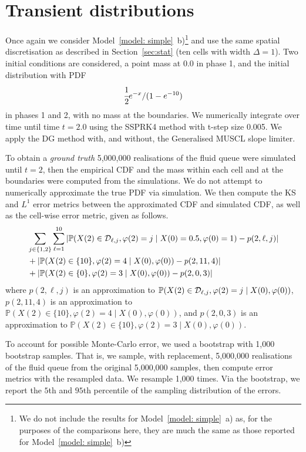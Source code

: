 \section{Transient distributions}
Once again we consider Model~\ref{model: simple}~b)\footnote{We do not include the results for Model~\ref{model: simple}~a) as, for the purposes of the comparisons here, they are much the same as those reported for Model~\ref{model: simple}~b)} and use the same spatial discretisation as described in Section~\ref{sec:stat} (ten cells with width \(\Delta=1\)). Two initial conditions are considered, a point mass at 0.0 in phase 1, and the initial distribution with PDF 
\begin{align}
	\cfrac{1}{2}e^{-x}/(1-e^{-10})\label{eqn: exp init cond}
\end{align}
in phases 1 and 2, with no mass at the boundaries. We numerically integrate over time until time \(t=2.0\) using the SSPRK4 method with t-step size 0.005. We apply the DG method with, and without, the Generalised MUSCL slope limiter. 

To obtain a \emph{ground truth} 5,000,000 realisations of the fluid queue were simulated until \(t=2\), then the empirical CDF and the mass within each cell and at the boundaries were computed from the simulations. We do not attempt to numerically approximate the true PDF via simulation. We then compute the KS and \(L^1\) error metrics between the approximated CDF and simulated CDF, as well as the cell-wise error metric, given as follows. 
\begin{align}
	&\sum_{j\in\{1,2\}}\sum_{\ell=1}^{10} \left|\mathbb P(X(2)\in\mathcal{D}_{\ell,j}, \varphi(2)=j\mid X(0)=0.5,\varphi(0)=1)-p(2,\ell,j)\right|\nonumber 
	\\&+\left|\mathbb P(X(2)\in\{10\}, \varphi(2)=4\mid X(0),\varphi(0))-p(2,11,4)\right|\nonumber 
	\\&+\left|\mathbb P(X(2)\in\{0\}, \varphi(2)=3\mid X(0),\varphi(0))-p(2,0,3)\right| \label{eqn: cell errors 2}
\end{align}
where \(p(2,\ell,j)\) is an approximation to \(\mathbb P(X(2)\in\mathcal{D}_{\ell,j}, \varphi(2)=j\mid X(0),\varphi(0))\), \(p(2,11,4)\) is an approximation to \(\mathbb P(X(2)\in\{10\}, \varphi(2)=4\mid X(0),\varphi(0))\), and \(p(2,0,3)\) is an approximation to \(\mathbb P(X(2)\in\{10\}, \varphi(2)=3\mid X(0),\varphi(0))\). 

To account for possible Monte-Carlo error, we used a bootstrap with 1,000 bootstrap samples. That is, we sample, with replacement, 5,000,000 realisations of the fluid queue from the original 5,000,000 samples, then compute error metrics with the resampled data. We resample 1,000 times. Via the bootstrap, we report the \(5\)th and \(95\)th percentile of the sampling distribution of the errors. 

